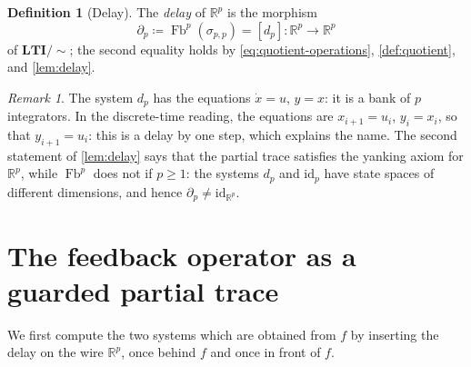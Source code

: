 \documentclass[11pt,a4paper]{article}
\theoremstyle{plain}
\theoremstyle{definition}
\newtheorem{definition}[theorem]{Definition}
\theoremstyle{remark}
\newtheorem{remark}[theorem]{Remark}
\DeclareMathOperator{\Fb}{Fb}
\newcommand{\R}{\mathbb{R}}
\newcommand{\id}{\mathrm{id}}
\newcommand{\LTIq}{\mathbf{LTI}/{\sim}}
\begin{document}
\begin{definition}[Delay]
    The \emph{delay} of $\R^p$ is the morphism
    \begin{equation}
        \partial_p \coloneqq \Fb^p(\sigma_{p,p}) = [d_p] \colon \R^p \to \R^p
    \end{equation}
    of $\LTIq$; the second equality holds by \cref{eq:quotient-operations}, \cref{def:quotient}, and \cref{lem:delay}.
\end{definition}

\begin{remark}
    \label{rem:delay-reading}
    The system $d_p$ has the equations $\dot x = u$, $y = x$: it is a bank of $p$ integrators.
    In the discrete-time reading, the equations are $x_{i+1} = u_i$, $y_i = x_i$, so that $y_{i+1} = u_i$: this is a delay by one step, which explains the name.
    The second statement of \cref{lem:delay} says that the partial trace satisfies the yanking axiom for $\R^p$, while $\Fb^p$ does not if $p \geq 1$: the systems $d_p$ and $\id_p$ have state spaces of different dimensions, and hence $\partial_p \neq \id_{\R^p}$.
\end{remark}

\section{The feedback operator as a guarded partial trace}

We first compute the two systems which are obtained from $f$ by inserting the delay on the wire $\R^p$, once behind $f$ and once in front of $f$.
\end{document}
